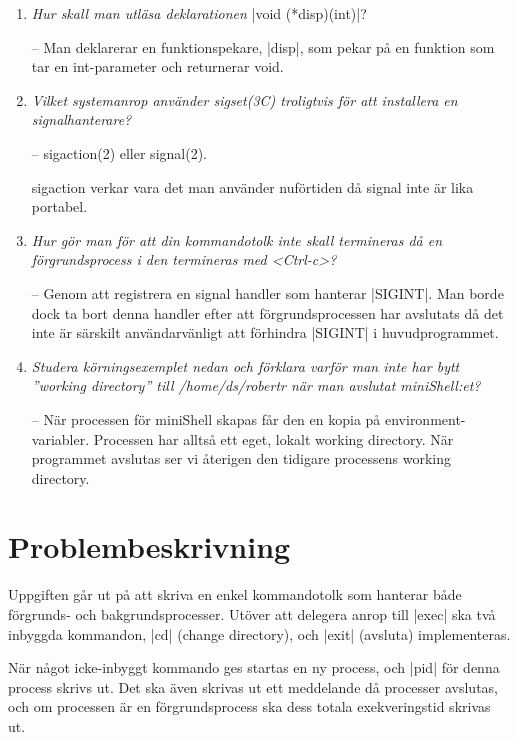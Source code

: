 \documentclass[paper=a4, fontsize=11pt]{scrartcl} %
\numberwithin{equation}{section} %
\numberwithin{figure}{section} %
\numberwithin{table}{section} %
\begin{document}
\begin{enumerate}[1)]

\item
\emph{Hur skall man utläsa deklarationen} |void (*disp)(int)|?

-- Man deklarerar en funktionspekare, |disp|, som pekar på en funktion som 
tar en int-parameter och returnerar void.

\item
\emph{Vilket systemanrop använder sigset(3C) troligtvis för att 
installera en signalhanterare?} %

-- sigaction(2) eller signal(2).

sigaction verkar vara det man använder nuförtiden då signal inte är lika portabel.

\item
\emph{Hur gör man för att din kommandotolk inte skall termineras 
då en förgrundsprocess i den termineras med <Ctrl-c>?}

-- Genom att registrera en signal handler som hanterar |SIGINT|. 
Man borde dock ta bort denna handler efter att förgrundsprocessen har avslutats
då det inte är särskilt användarvänligt att förhindra |SIGINT| i huvudprogrammet.

\item
\emph{Studera körningsexemplet nedan och förklara varför man inte har bytt 
''working directory'' till /home/ds/robertr när man avslutat miniShell:et?}

-- När processen för miniShell skapas får den en kopia på environment-variabler. Processen har alltså ett eget, lokalt 
working directory. När programmet avslutas ser vi återigen den tidigare processens working directory.

\end{enumerate}

\section{Problembeskrivning}

Uppgiften går ut på att skriva en enkel kommandotolk 
som hanterar både förgrunds- och bakgrundsprocesser.
Utöver att delegera anrop till |exec| ska två inbyggda kommandon,
 |cd| (change directory), och |exit| (avsluta) implementeras.

När något icke-inbyggt kommando ges startas en ny process, och |pid| för denna process skrivs ut.
Det ska även skrivas ut ett meddelande då processer avslutas, och om processen är en förgrundsprocess ska dess totala exekveringstid skrivas ut.
\end{document}
